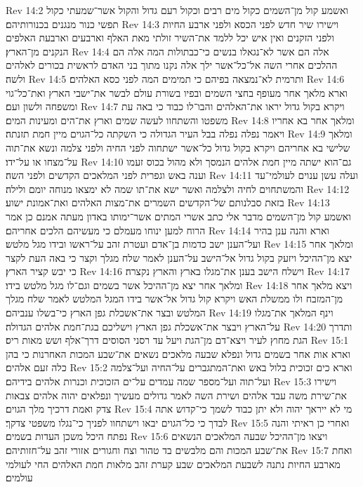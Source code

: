 Rev 14:2  ואשמע קול מן־השמים כקול מים רבים וכקול רעם גדול והקול אשר־שמעתי כקול תפשי כנור מנגנים בכנורותיהם׃
Rev 14:3  וישירו שיר חדש לפני הכסא ולפני ארבע החיות ולפני הזקנים ואין איש יכל ללמד את־השיר זולתי מאת האלף וארבעים וארבעת האלפים הנקנים מן־הארץ׃
Rev 14:4  אלה הם אשר לא־נגאלו בנשים כי־כבתולות המה אלה הם ההלכים אחרי השה אל־כל־אשר ילך אלה נקנו מתוך בני האדם לראשית בכורים לאלהים ולשה׃
Rev 14:5  ותרמית לא־נמצאה בפיהם כי תמימים המה לפני כסא האלהים׃
Rev 14:6  וארא מלאך אחר מעופף בחצי השמים ובפיו בשורת עולם לבשר את־ישבי הארץ ואת־כל־גוי ומשפחה ולשון ועם׃
Rev 14:7  ויקרא בקול גדול יראו את־האלהים והבו־לו כבוד כי באה עת משפטו והשתחוו לעשה שמים וארץ את־הים ומעינות המים׃
Rev 14:8  ומלאך אחר בא אחריו ויאמר נפלה נפלה בבל העיר הגדולה כי השקתה כל־הגוים מיין חמת תזנתה׃
Rev 14:9  ומלאך שלישי בא אחריהם ויקרא בקול גדול כל־אשר ישתחוה לפני החיה ולפני צלמה ונשא את־תוה על־מצחו או על־ידו׃
Rev 14:10  גם־הוא ישתה מיין חמת אלהים הנמסך ולא מהול בכוס זעמו וענה באש וגפרית לפני המלאכים הקדשים ולפני השה׃
Rev 14:11  ועלה עשן ענוים לעולמי־עד והמשתחוים לחיה ולצלמה ואשר ישא את־תו שמה לא ימצאו מנוחה יומם ולילה׃
Rev 14:12  בזאת סבלנותם של־הקדשים השמרים את־מצות האלהים ואת־אמונת ישוע׃
Rev 14:13  ואשמע קול מן־השמים מדבר אלי כתב אשרי המתים אשר־ימותו באדון מעתה אמנם כן אמר הרוח למען ינוחו מעמלם כי מעשיהם הלכים אחריהם׃
Rev 14:14  וארא והנה ענן בהיר ועל־הענן ישב כדמות בן־אדם ועטרת זהב על־ראשו ובידו מגל מלטש׃
Rev 14:15  ומלאך אחר יצא מן־ההיכל ויזעק בקול גדול אל־הישב על־הענן לאמר שלח מגלך וקצר כי באה העת לקצר כי יבש קציר הארץ׃
Rev 14:16  וישלח הישב בענן את־מגלו בארץ והארץ נקצרה׃
Rev 14:17  ומלאך אחר יצא מן־ההיכל אשר בשמים וגם־לו מגל מלטש בידו׃
Rev 14:18  ויצא מלאך אחר מן־המזבח ולו ממשלת האש ויקרא קול גדול אל־אשר בידו המגל המלטש לאמר שלח מגלך המלטש ובצר את־אשכלת גפן הארץ כי־בשלו ענביהם׃
Rev 14:19  וינף המלאך את־מגלו על־הארץ ויבצר את־אשכלת גפן הארץ וישליכם בגת־חמת אלהים הגדולה׃
Rev 14:20  ותדרך הגת מחוץ לעיר ויצא־דם מן־הגת ויעל עד רסני הסוסים דרך־אלף ושש מאות ריס׃
Rev 15:1  וארא אות אחר בשמים גדול ונפלא שבעה מלאכים נשאים את־שבע המכות האחרנות כי בהן כלה זעם אלהים׃
Rev 15:2  וארא כים זכוכית בלול באש ואת־המתגברים על־החיה ועל־צלמה ועל־תוה ועל־מספר שמה עמדים על־ים הזכוכית וכנרות אלהים בידיהם׃
Rev 15:3  וישירו את־שירת משה עבד אלהים ושירת השה לאמר גדולים מעשיך ונפלאים יהוה אלהים צבאות צדק ואמת דרכיך מלך הגוים׃
Rev 15:4  מי לא ייראך יהוה ולא יתן כבוד לשמך כי־קדוש אתה לבדך כי כל־הגוים יבאו וישתחוו לפניך כי־נגלו משפטי צדקך׃
Rev 15:5  ואחרי כן ראיתי והנה נפתח היכל משכן העדות בשמים׃
Rev 15:6  ויצאו מן־ההיכל שבעה המלאכים הנשאים את־שבע המכות והם מלבשים בד טהור וצח וחגורים אזורי זהב על־חזותיהם׃
Rev 15:7  ואחת מארבע החיות נתנה לשבעת המלאכים שבע קערת זהב מלאות חמת האלהים החי לעולמי עולמים׃

